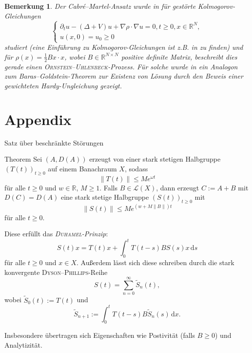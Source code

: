 \documentclass{beamer}
\theoremstyle{break}
\newtheorem{nt}[thm]{Bemerkung}
\begin{document}
\begin{frame}
\begin{nt}
Der Cabr\'e--Martel-Ansatz wurde in \cite{goldstein-rhandi} für gestörte Kolmogorov-Gleichungen
\begin{equation}%
\begin{cases}
\partial_t u - (\Delta+V) u +\nabla \rho \cdot \nabla u=0, t\ge 0, x\in \mathbb R^N,\\
u(x,0)=u_0 \ge 0
\end{cases}
\end{equation}
studiert (eine Einführung zu Kolmogorov-Gleichungen ist z.B. in \cite{lorenzi} zu finden) und für $\rho(x)=\frac{1}{2} Bx\cdot x$, wobei $B\in \mathbb R^{N\times N}$ positive definite Matrix, beschreibt dies gerade einen \textsc{Ornstein--Uhlenbeck}-Prozess.  Für solche wurde in \cite{goldstein-rhandi} ein Analogon zum Baras--Goldstein-Theorem zur Existenz von Lösung durch den Beweis einer gewichteten Hardy-Ungleichung gezeigt.
\end{nt}
\end{frame}

\section{Appendix}
\begin{frame}[allowframebreaks]{Satz über beschränkte Störungen}
\begin{block}{Theorem}
Sei $(A, D(A))$ erzeugt von einer stark stetigen Halbgruppe $(T(t))_{t\ge 0}$ auf einem Banachraum $X$, sodass
\begin{equation}
\|T(t)\|\le M e^{\omega t}
\end{equation}
f\"ur alle $t\ge 0$ und $w\in \mathbb R$, $M\ge 1$. Falls $B\in \mathcal L(X)$, dann erzeugt $C:=A+B$ mit $D(C)=D(A)$ eine stark stetige Halbgruppe $(S(t))_{t\ge 0}$ mit
\begin{equation}
\|S(t)\|\le M e^{(w+ M\|B\|) t}
\end{equation}
f\"ur alle $t\ge 0$. 
\end{block}
\begin{block}{}
Diese erf\"ullt das \emph{\textsc{Duhamel}-Prinzip}:
\begin{equation}\label{duhamel}
S(t) x = T(t) x + \int_0^t T(t-s) B S(s) x \,\mathrm ds
\end{equation}
f\"ur alle $t\ge 0$ und $x\in X$. 
Außerdem lässt sich diese schreiben durch die stark konvergente \textsc{Dyson--Phillips}-Reihe
\begin{equation}
S(t)=\sum_{n=0}^\infty \tilde S_n(t),
\end{equation}
wobei $\tilde S_0(t):=T(t)$ und
\begin{equation}
\tilde S_{n+1} := \int_0^t T(t-s) B\tilde S_n(s)\, \mathrm dx.
\end{equation}

Insbesondere \"ubertragen sich Eigenschaften wie Postivit\"at (falls $B\ge 0$) und Analytizit\"at.
\end{block}

\end{frame}
\end{document}
